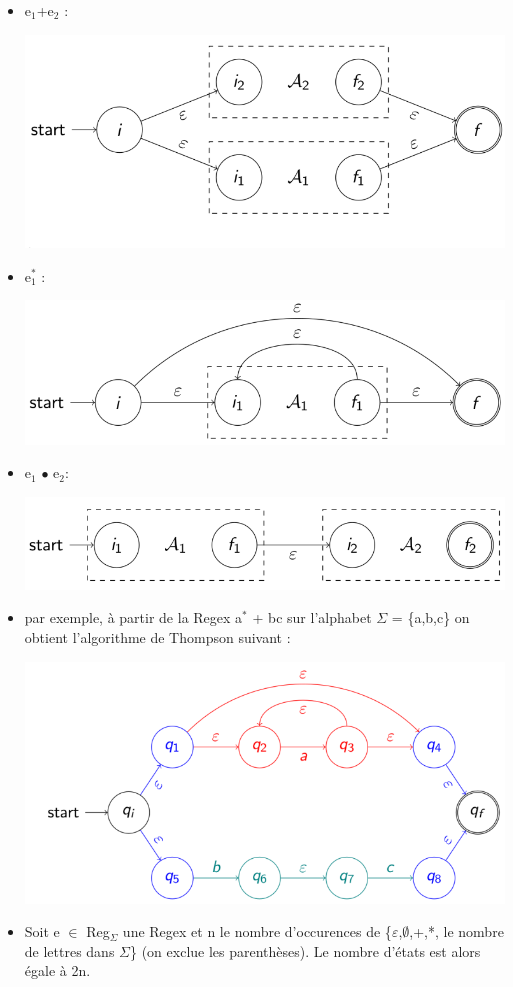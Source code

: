 \documentclass{article}
\begin{document}
\begin{itemize}
    \item e$_{1}$+e$_{2}$ :
    \begin{center}
        \includegraphics[scale=0.3]{Image5.png}
    \end{center}
    \item e$_{1}^{*}$ :
    \begin{center}
        \includegraphics[scale=0.3]{Image6.png}
    \end{center}
    \item e$_{1}$ $\bullet$ e$_{2}$:
    \begin{center}
	\includegraphics[scale=0.3]{Image7.png}
    \end{center}
    \item par exemple, à partir de la Regex a$^{*}$ + bc sur l'alphabet $\Sigma$ = \{a,b,c\} on obtient l'algorithme de Thompson suivant :
    \begin{center}
        \includegraphics[scale=0.25]{Image8.png}
    \end{center}
    \item Soit e $\in$ Reg$_{\Sigma}$ une Regex et n le nombre d'occurences de \{$\varepsilon$,$\emptyset$,+,*, le nombre de lettres dans $\Sigma$\} (on exclue les parenthèses). Le nombre d'états est alors égale à 2n.


\end{itemize}
\end{document}
